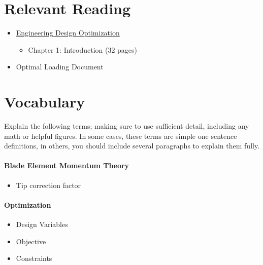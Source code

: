 \documentclass[11pt,twocolumn]{article}
\begin{document}
	
	
	
\section*{Relevant Reading}
\label{sec:reading}

\begin{itemize}
	\item \href{http://flowlab.groups.et.byu.net/mdobook.pdf}{Engineering Design Optimization} 
	\begin{itemize}
		\item Chapter 1: Introduction (32 pages)
	\end{itemize}
	\item Optimal Loading Document
\end{itemize}



\section{Vocabulary}
\label{sec:vocab}

Explain the following terms; making sure to use sufficient detail, including any math or helpful figures.
In some cases, these terms are simple one sentence definitions, in others, you should include several paragraphs to explain them fully.

\paragraph{Blade Element Momentum Theory}
\begin{itemize}
	\item Tip correction factor
\end{itemize}

\paragraph{Optimization}
\begin{itemize}
	\item Design Variables
	\item Objective
	\item Constraints
\end{itemize}
\end{document}
